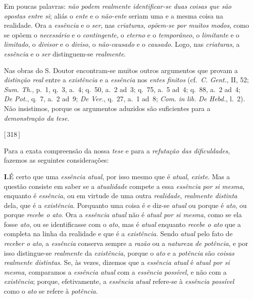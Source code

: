 \documentclass[12pt,a4paper]{article}
\newcommand{\pg}[1]{\thinspace\textup{[\,#1\,]}\thinspace}
\begin{document}
{  Em poucas palavras: \emph{não podem realmente identificar-se duas coisas que
  são opostas entre si}; aliás o \emph{ente} e o \emph{não-ente} seriam uma e a
  mesma coisa na realidade. Ora a \emph{essência} e o \emph{ser}, nas
  \emph{criaturas}, \emph{opõem-se por muitos modos}, como se opõem o
  \emph{necessário} e o \emph{contingente}, o \emph{eterno} e o
  \emph{temporâneo}, o \emph{limitante} e o \emph{limitado}, o \emph{divisor} e
  o \emph{diviso}, o \emph{não-causado} e o \emph{causado}. Logo, nas
  \emph{criaturas}, a \emph{essência} e o \emph{ser} distinguem-se
  \emph{realmente}.

  Nas obras do S. Doutor encontram-se muitos outros argumentos que provam a
  \emph{distinção real} entre a \emph{existência} e a \emph{essência} nos
  \emph{entes finitos} (cf.\ \emph{C. Gent.}, II, 52; \emph{Sum. Th.}, p.~1,
  q.~3, a.~4; q.~50, a.~2 ad~3; q.~75, a.~5 ad~4; q.~88, a.~2 ad~4; \emph{De
  Pot.}, q.~7, a.~2 ad~9; \emph{De Ver.}, q.~27, a.~1 ad~8; \emph{Com. in lib.
  De Hebd.}, l.~2). \textemdash{} Não insistimos, porque os argumentos aduzidos
  são suficientes para a \emph{demonstração da tese}.} \pg{318}

\medskip
\noindent Para a exata compreensão da nossa \emph{tese} e para a \emph{refutação
das dificuldades}, fazemos as seguintes considerações:

\medskip
\noindent\textbf{I.}\quad É certo que uma \emph{essência atual}, por isso mesmo
que é \emph{atual}, \emph{existe}. Mas a questão consiste em saber se a
\emph{atualidade} compete a essa \emph{essência} \emph{por si mesma}, enquanto
é \emph{essência}, ou em virtude de uma outra \emph{realidade}, \emph{realmente
distinta} dela, que é a \emph{existência}. Porquanto uma coisa é e diz-se
\emph{atual} ou porque é \emph{ato}, ou porque \emph{recebe o ato}. Ora a
\emph{essência atual} não é \emph{atual por si mesma}, como se ela fosse
\emph{ato}, ou se identificasse com o \emph{ato}, \textemdash{} mas é
\emph{atual} enquanto \emph{recebe o ato} que a completa na linha da realidade
e que é a \emph{existência}. Sendo \emph{atual} pelo fato de \emph{receber o
ato}, a \emph{essência} conserva sempre a \emph{razão} ou a \emph{natureza de
potência}, e por isso distingue-se \emph{realmente} da \emph{existência}, porque
o \emph{ato} e a \emph{potência} são \emph{coisas realmente distintas}.
\textemdash{} Se, às vezes, dizemos que a \emph{essência atual} é \emph{atual
por si mesma}, comparamos a \emph{essência atual} com a \emph{essência
possível}, e não com a \emph{existência}; porque, efetivamente, a \emph{essência
atual} refere-se à \emph{essência possível} como o \emph{ato} se refere à
\emph{potência}.
\end{document}
